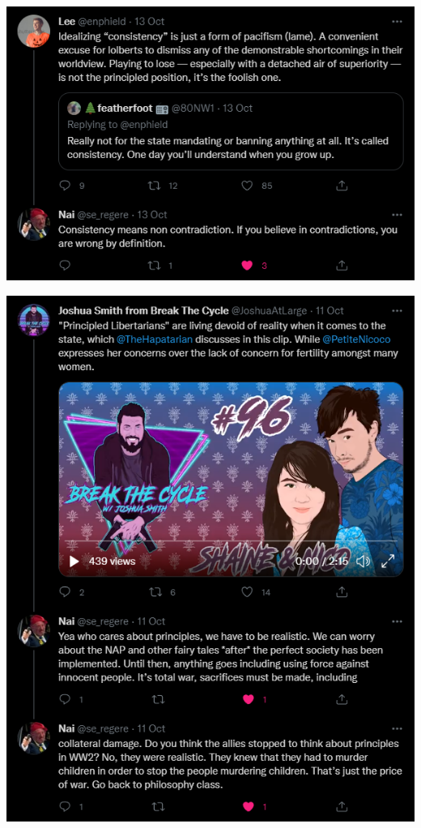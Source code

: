 \documentclass[11pt]{article}
\begin{document}
\begin{center}
\includegraphics[width=.9\linewidth]{./images/enphield-against-logic.png}
\end{center}

\begin{center}
\includegraphics[width=.9\linewidth]{./images/joshuaatlarge-against-logic.png}
\end{center}
\end{document}
